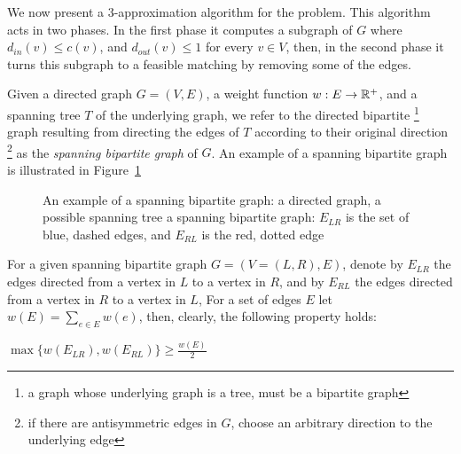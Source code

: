 \label{sub:cm}
We now present a 3-app\-roximation algorithm for the \textsc{\CARPOOL{}} problem.
This algorithm acts in two phases.
In the first phase it computes a subgraph of $G$ 
where $d_{in}(v) \leq c(v)$, and $d_{out}(v) \leq 1$ for every $v \in V$, 
then, in the second phase it turns this subgraph to a feasible matching
by removing some of the edges.

Given a directed graph $G = (V, E)$,
a weight function $w : E \rightarrow \mathbb{R}^+$, 
and a spanning tree $T$ of the underlying graph, 
we refer to the directed bipartite
\footnote{a graph whose underlying graph is a tree, must be a bipartite graph}
graph resulting from directing the edges 
of $T$ according to their original direction
\footnote{if there are antisymmetric edges in $G$, 
choose an arbitrary direction to the underlying edge}
as the \emph{spanning bipartite graph} of $G$.
An example of a spanning bipartite graph is illustrated in 
Figure~\ref{fig:spanning-bipartite-graph}

\begin{figure}
\centering

\caption{
\label{fig:spanning-bipartite-graph}
An example of a spanning bipartite graph:
 a directed graph, 
 a possible spanning tree  
 a spanning bipartite graph:
$E_{LR}$ is the set of blue, dashed edges, 
and $E_{RL}$ is the red, dotted edge   
}
\end{figure}

For a given spanning bipartite graph $G = (V = (L, R), E)$, 
denote by $E_{LR}$ the edges directed from a vertex in $L$ to a vertex in $R$,
and by $E_{RL}$ the edges directed from a vertex in $R$ to a vertex in $L$,
For a set of edges $E$ let $w(E) = \sum_{e \in E}{w(e)}$, 
then, clearly, the following property holds:

\begin{observation}
\label{ob:geq_half}
$ \max\{w(E_{LR}), w(E_{RL})\}  \geq \frac{w(E)}{2} $
\end{observation}


